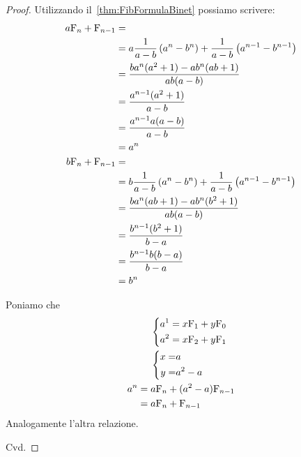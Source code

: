 \begin{proof}
	Utilizzando il~\vref{thm:FibFormulaBinet} possiamo scrivere:
	\begin{align*}
		a\mathrm{F}_{n}+\mathrm{F}_{n-1}={} &                                         \\
		={}                   & a\dfrac{1}{a-b}\left(a^n-b^n\right)
		+\dfrac{1}{a-b}\left(a^{n-1}-b^{n-1}\right)                     \\
		={}                   & \dfrac{ba^n(a^2+1)-ab^n(ab+1)}{ab(a-b)} \\
		={}                   & \dfrac{a^{n-1}(a^2+1)}{a-b}             \\
		={}                   & \dfrac{a^{n-1}a(a-b)}{a-b}              \\
		={}                   & a^n                                     \\
		b\mathrm{F}_{n}+\mathrm{F}_{n-1}={} &                                         \\
		={}                   & b\dfrac{1}{a-b}\left(a^n-b^n\right)
		+\dfrac{1}{a-b}\left(a^{n-1}-b^{n-1}\right)                     \\
		={}                   & \dfrac{ba^n(ab+1)-ab^n(b^2+1)}{ab(a-b)} \\
		={}                   & \dfrac{b^{n-1}(b^2+1)}{b-a}             \\
		={}                   & \dfrac{b^{n-1}b(b-a)}{b-a}              \\
		={}                   & b^n
	\end{align*}

	Poniamo che
	\begin{align*}
		       & \left\{
		\begin{aligned}
			a^1={} & x\mathrm{F}_{1}+y\mathrm{F}_{0} \\
			a^2={} & x\mathrm{F}_{2}+y\mathrm{F}_{1} \\
		\end{aligned}
		\right.                            \\
		       & \left\{
		\begin{aligned}
			x= & a     \\
			y= & a^2-a
		\end{aligned}
		\right.                            \\
		a^n={} & a\mathrm{F}_{n}+(a^2-a)\mathrm{F}_{n-1} \\
		={}    & a\mathrm{F}_{n}+\mathrm{F}_{n-1}        \\
	\end{align*}
	Analogamente l'altra relazione.

	Cvd.
\end{proof}

